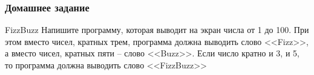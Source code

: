 \begin{frame}
\frametitle{Домашнее задание}

\begin{block}{FizzBuzz}
    Напишите программу, которая выводит на экран числа от 1 до 100.
    При этом вместо чисел, кратных трем, программа должна выводить слово <<Fizz>>,
    а вместо чисел, кратных пяти -- слово <<Buzz>>. 
    Если число кратно и 3, и 5, то программа должна выводить слово <<FizzBuzz>>
\end{block}

\end{frame}

